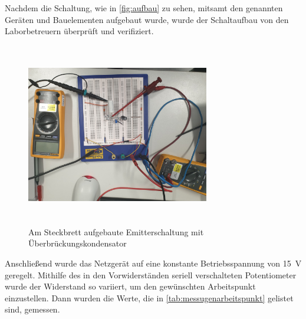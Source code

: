 \documentclass[12pt,english,ngerman]{scrartcl}
\begin{document}
Nachdem die Schaltung, wie in  \autoref{fig:aufbau} zu sehen, mitsamt 
den genannten Geräten und Bauelementen aufgebaut wurde, wurde der Schaltaufbau von den 
Laborbetreuern überprüft und verifiziert.


\begin{figure}[H]
    \centering
    \includegraphics[width=8cm, height=8cm,keepaspectratio]{./figures/foto.png}
    \caption{Am Steckbrett aufgebaute Emitterschaltung mit Überbrückungskondensator}
    \label{fig:aufbau}
\end{figure}



Anschließend wurde das Netzgerät auf eine konstante
Betriebsspannung von \SI{15}{\volt} geregelt. Mithilfe des in den Vorwiderständen
seriell verschalteten Potentiometer wurde der Widerstand so variiert, um den 
gewünschten Arbeitspunkt einzustellen. Dann wurden die Werte, die in
\autoref{tab:messugenarbeitspunkt} gelistet sind, gemessen.
\end{document}
